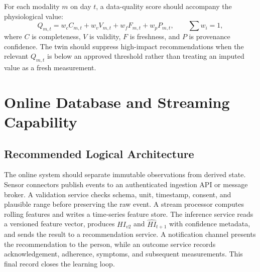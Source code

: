\documentclass[11pt,a4paper]{article}
\begin{document}
For each modality $m$ on day $t$, a data-quality score should accompany the physiological value:
\begin{equation}
Q_{m,t}=w_c C_{m,t}+w_v V_{m,t}+w_f F_{m,t}+w_p P_{m,t},
\qquad \sum w_i=1,
\end{equation}
where $C$ is completeness, $V$ is validity, $F$ is freshness, and $P$ is provenance confidence. The twin should suppress high-impact recommendations when the relevant $Q_{m,t}$ is below an approved threshold rather than treating an imputed value as a fresh measurement.

\section{Online Database and Streaming Capability}
\subsection{Recommended Logical Architecture}
The online system should separate immutable observations from derived state. Sensor connectors publish events to an authenticated ingestion API or message broker. A validation service checks schema, unit, timestamp, consent, and plausible range before preserving the raw event. A stream processor computes rolling features and writes a time-series feature store. The inference service reads a versioned feature vector, produces $HI_{v2}$ and $\widehat{HI}_{t+1}$ with confidence metadata, and sends the result to a recommendation service. A notification channel presents the recommendation to the person, while an outcome service records acknowledgement, adherence, symptoms, and subsequent measurements. This final record closes the learning loop.
\end{document}
